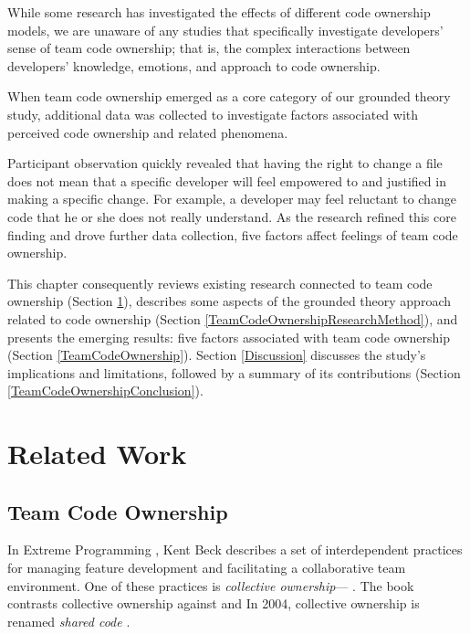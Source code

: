 While some research has investigated the effects of different code ownership models, we are unaware of any studies that specifically investigate developers' sense of team code ownership; that is, the complex interactions between developers' knowledge, emotions, and approach to code ownership.  

When team code ownership emerged as a core category of our grounded theory study, additional data was collected to investigate factors associated with perceived code ownership and related phenomena. 

Participant observation quickly revealed that having the right to change a file does not mean that a specific developer will feel empowered to and justified in making a specific change. For example, a developer may feel reluctant to change code that he or she does not really understand. As the research refined this core finding and drove further data collection, five factors affect feelings of team code ownership. 

This chapter consequently reviews existing research connected to team code ownership (Section \ref{TeamCodeOwnnershipRelatedWork}), describes some aspects of the grounded theory approach related to code ownership (Section \ref{TeamCodeOwnershipResearchMethod}), and presents the emerging results: five factors associated with team code ownership (Section \ref{TeamCodeOwnership}). Section \ref{Discussion} discusses the study's implications and limitations, followed by a summary of its contributions (Section \ref{TeamCodeOwnershipConclusion}).
\section{Related Work}
\label{TeamCodeOwnnershipRelatedWork}

\subsection{Team Code Ownership}
In Extreme Programming \cite{BeckExtremeProgramming2004}, Kent Beck describes a set of interdependent practices for managing feature development and facilitating a collaborative team environment. One of these practices is \textit{collective ownership}--- \cite{BeckExtremeProgramming1999}. The book contrasts collective ownership against  and  In 2004, collective ownership is renamed \textit{shared code} \cite{BeckExtremeProgramming2004}.

